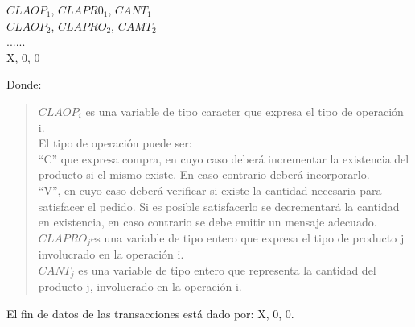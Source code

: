 \documentclass[11pt]{amsart}
\begin{document}
\begin{center}
$CLAOP_1$, $CLAPR0_1$, $CANT_1$\\
$CLAOP_2$, $CLAPRO_2$, $CAMT_2$\\
......\\
X, 0, 0\\
\end{center}

\noindent Donde:\\

\begin{quote}
$CLAOP_i$ es una variable de tipo caracter que expresa el tipo de operación i.\\
El tipo de operación puede ser:\\
“C” que expresa compra, en cuyo caso deberá incrementar la existencia del producto si el mismo existe. En caso contrario deberá incorporarlo.\\
“V”, en cuyo caso deberá verificar si existe la cantidad necesaria para satisfacer el pedido. Si es posible satisfacerlo se decrementará la cantidad en existencia, en caso contrario se debe emitir un mensaje adecuado.\\
$CLAPRO_j$es una variable de tipo entero que expresa el tipo de producto j involucrado en la operación i.\\
$CANT_j$ es una variable de tipo entero que representa la cantidad del producto j, involucrado en la operación i.\\
\end{quote}

El fin de datos de las transacciones está dado por: X, 0, 0.
\end{document}
